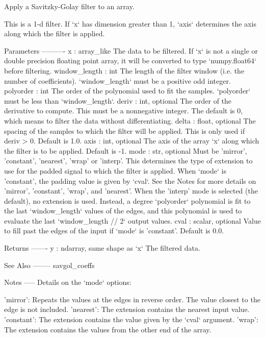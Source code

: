 \begin{DoxyVerb}Apply a Savitzky-Golay filter to an array.

This is a 1-d filter.  If `x`  has dimension greater than 1, `axis`
determines the axis along which the filter is applied.

Parameters
----------
x : array_like
    The data to be filtered.  If `x` is not a single or double precision
    floating point array, it will be converted to type `numpy.float64`
    before filtering.
window_length : int
    The length of the filter window (i.e. the number of coefficients).
    `window_length` must be a positive odd integer.
polyorder : int
    The order of the polynomial used to fit the samples.
    `polyorder` must be less than `window_length`.
deriv : int, optional
    The order of the derivative to compute.  This must be a
    nonnegative integer.  The default is 0, which means to filter
    the data without differentiating.
delta : float, optional
    The spacing of the samples to which the filter will be applied.
    This is only used if deriv > 0.  Default is 1.0.
axis : int, optional
    The axis of the array `x` along which the filter is to be applied.
    Default is -1.
mode : str, optional
    Must be 'mirror', 'constant', 'nearest', 'wrap' or 'interp'.  This
    determines the type of extension to use for the padded signal to
    which the filter is applied.  When `mode` is 'constant', the padding
    value is given by `cval`.  See the Notes for more details on 'mirror',
    'constant', 'wrap', and 'nearest'.
    When the 'interp' mode is selected (the default), no extension
    is used.  Instead, a degree `polyorder` polynomial is fit to the
    last `window_length` values of the edges, and this polynomial is
    used to evaluate the last `window_length // 2` output values.
cval : scalar, optional
    Value to fill past the edges of the input if `mode` is 'constant'.
    Default is 0.0.

Returns
-------
y : ndarray, same shape as `x`
    The filtered data.

See Also
--------
savgol_coeffs

Notes
-----
Details on the `mode` options:

    'mirror':
        Repeats the values at the edges in reverse order.  The value
        closest to the edge is not included.
    'nearest':
        The extension contains the nearest input value.
    'constant':
        The extension contains the value given by the `cval` argument.
    'wrap':
        The extension contains the values from the other end of the array.


\end{DoxyVerb}
